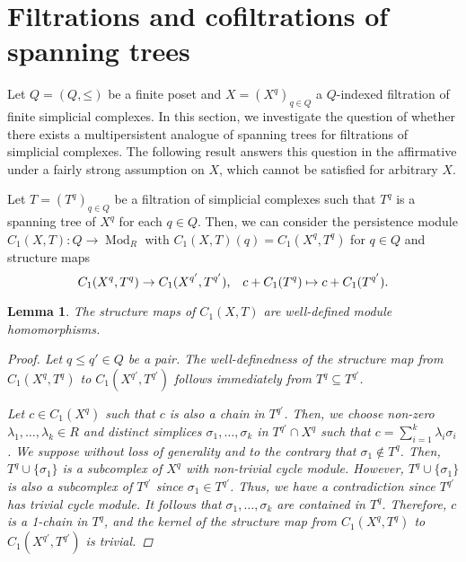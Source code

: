 \documentclass[oneside]{amsart}
\newtheorem{lemma}[theorem]{Lemma}
\theoremstyle{definition}
\newcommand\Mod[1]{\operatorname{Mod}_{#1}}
\begin{document}
\section{Filtrations and cofiltrations of spanning trees}
\label{section:CofiltrationsOfSpanningTrees}

Let $Q = (Q, \mathord\leq)$ be a finite poset and $X = (X^q)_{q \in Q}$ a $Q$-indexed filtration of finite simplicial complexes.
In this section, we investigate the question of whether there exists a multipersistent analogue of spanning trees for filtrations of simplicial complexes.
The following result answers this question in the affirmative under a fairly strong assumption on $X$, which cannot be satisfied for arbitrary $X$.

Let $T = (T^q)_{q \in Q}$ be a filtration of simplicial complexes such that $T^q$ is a spanning tree of $X^q$ for each $q \in Q$.
Then, we can consider the persistence module $C_1(X, T)\colon Q \to \Mod{R}$ with $C_1(X, T)(q) = C_1(X^q, T^q)$ for $q \in Q$ and structure maps
\[ C_1(X^q, T^q) \to C_1(X^{q'}, T^{q'}) \text, \quad c + C_1(T^q) \mapsto c + C_1(T^{q'}) \text. \]

\begin{lemma}%
    \label{lemma:RelHomWelldefined}
    The structure maps of $C_1(X, T)$ are well-defined module homomorphisms.

    \begin{proof}
        Let $q \leq q' \in Q$ be a pair.
        The well-definedness of the structure map from $C_1(X^q, T^q)$ to $C_1(X^{q'}, T^{q'})$ follows immediately from $T^q \subseteq T^{q'}$.
    
        Let $c \in C_1(X^q)$ such that $c$ is also a chain in $T^{q'}$.
        Then, we choose non-zero $\lambda_1, \dotsc, \lambda_k \in R$ and distinct simplices $\sigma_1, \dotsc, \sigma_k$ in $T^{q'} \cap X^{q}$ such that $c = \sum_{i = 1}^k \lambda_i \sigma_i$.
        We suppose without loss of generality and to the contrary that $\sigma_1 \notin T^q$.
        Then, $T^q \cup \{ \sigma_1 \}$ is a subcomplex of $X^q$ with non-trivial cycle module.
        However, $T^q \cup \{ \sigma_1 \}$ is also a subcomplex of $T^{q'}$ since $\sigma_1 \in T^{q'}$.
        Thus, we have a contradiction since $T^{q'}$ has trivial cycle module.
        It follows that $\sigma_1, \dotsc, \sigma_k$ are contained in $T^q$.
        Therefore, $c$ is a 1-chain in $T^q$, and the kernel of the structure map from $C_1(X^q, T^q)$ to $C_1(X^{q'}, T^{q'})$ is trivial.
    \end{proof}    
\end{lemma}
\end{document}

